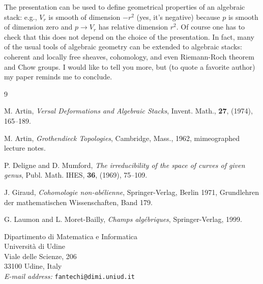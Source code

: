 \documentclass[12pt]{memoir}
\begin{document}
The presentation can be used to define geometrical properties of an algebraic stack: e.g., $V_r$ is smooth of dimension $-r^2$ (yes, it's negative) because $p$ is smooth of dimension zero and $p \to V_r$ has relative dimension $r^2$. Of course one has to check that this does not depend on the choice of the presentation. In fact, many of the usual tools of algebraic geometry can be extended to algebraic stacks: coherent and locally free sheaves, cohomology, and even Riemann-Roch theorem and Chow groups. I would like to tell you more, but (to quote a favorite author) my paper reminds me to conclude.


\begin{thebibliography}{9}

M. Artin, \emph{Versal Deformations and Algebraic Stacks}, Invent. Math., \textbf{27}, (1974), 165--189.

M. Artin, \emph{Grothendieck Topologies}, Cambridge, Mass., 1962, mimeographed lecture notes.

P. Deligne and D. Mumford, \emph{The irreducibility of the space of curves of given genus}, Publ. Math. IHES, \textbf{36}, (1969), 75--109.

J. Giraud, \emph{Cohomologie non-ab\'elienne}, Springer-Verlag, Berlin 1971, Grundlehren der mathematischen Wissenschaften, Band 179.

G. Laumon and L. Moret-Bailly, \emph{Champs alg\'ebriques}, Springer-Verlag, 1999.

\end{thebibliography}

\vspace{2em}

\noindent Dipartimento di Matematica e Informatica\\
Universit\`a di Udine\\
Viale delle Scienze, 206\\
33100 Udine, Italy\\
\emph{E-mail address:} \texttt{fantechi@dimi.uniud.it}
\end{document}
